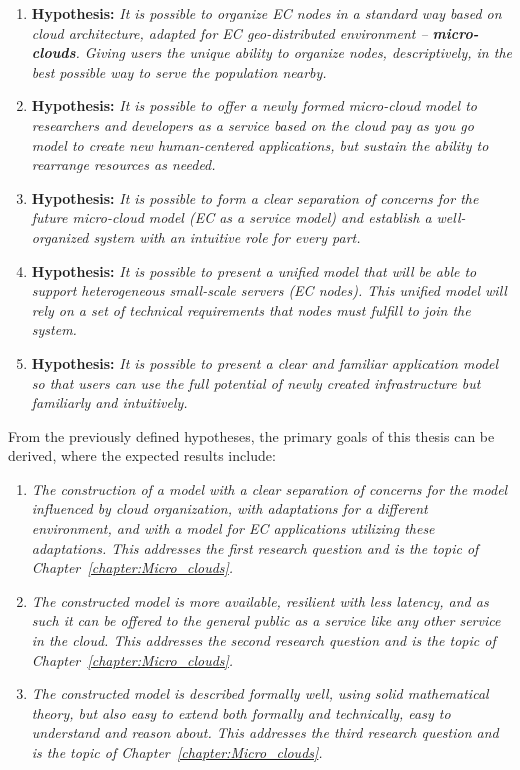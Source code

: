 \begin{enumerate}[start=1,label={(\bfseries \arabic*)}]
	\item \textbf{Hypothesis:} \textit{It is possible to organize EC nodes in a standard way based on cloud architecture, adapted for EC geo-distributed environment -- \textbf{micro-clouds}. Giving users the unique ability to organize nodes, descriptively, in the best possible way to serve the population nearby.}
	\item \textbf{Hypothesis:} \textit{It is possible to offer a newly formed micro-cloud model to researchers and developers as a service based on the cloud pay as you go model to create new human-centered applications, but sustain the ability to rearrange resources as needed.}
	\item \textbf{Hypothesis:} \textit{It is possible to form a clear separation of concerns for the future micro-cloud model (EC as a service model) and establish a well-organized system with an intuitive role for every part.} 
	\item \textbf{Hypothesis:} \textit{It is possible to present a unified model that will be able to support heterogeneous small-scale servers (EC nodes). This unified model will rely on a set of technical requirements that nodes must fulfill to join the system.}
	\item \textbf{Hypothesis:} \textit{It is possible to present a clear and familiar application model so that users can use the full potential of newly created infrastructure but familiarly and intuitively.}
\end{enumerate}

\noindent
From the previously defined hypotheses, the primary goals of this thesis can be derived, where the expected results include:

\begin{enumerate}[start=1,label={(\bfseries \arabic*)}]
	\item \textit{The construction of a model with a clear separation of concerns for the model influenced by cloud organization, with adaptations for a different environment, and with a model for EC applications utilizing these adaptations. This addresses the first research question and is the topic of Chapter~\ref{chapter:Micro_clouds}.}
	\item \textit{The constructed model is more available, resilient with less latency, and as such it can be offered to the general public as a service like any other service in the cloud. This addresses the second research question and is the topic of Chapter~\ref{chapter:Micro_clouds}.}
	\item \textit{The constructed model is described formally well, using solid mathematical theory, but also easy to extend both formally and technically, easy to understand and reason about. This addresses the third research question and is the topic of Chapter~\ref{chapter:Micro_clouds}.}
\end{enumerate}
%
%
